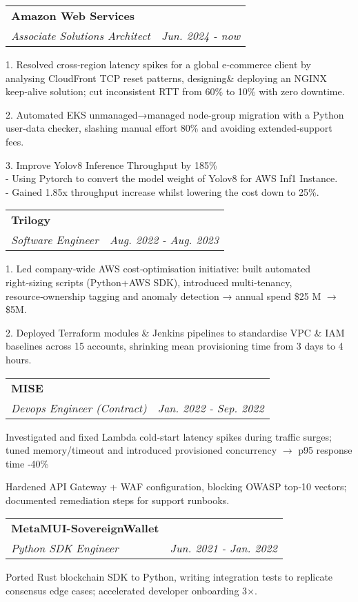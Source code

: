 \documentclass[letterpaper,11pt]{article}
\makeatletter
\renewenvironment{itemize}{
  \begin{list}{}{
    \setlength{\leftmargin}{0.6em}
    \setlength{\textwidth}{7.5in}
    \setlength{\topmargin}{-0.6in}
    \setlength{\textheight}{19.5in}
  }
}{
  \end{list}
}
\newcommand{\resitem}[1]{\item #1 \vspace{-2pt}}
\newcommand{\resheading}[1]{{\large \parashade[.9]{sharpcorners}{\textbf{#1 \vphantom{p\^{E}}}}}}
\newcommand{\ressubheading}[4]{
\begin{tabular*}{6.5in}{l@{\extracolsep{\fill}}r}
		\textbf{#1} & #2 \\
		\textit{#3} & \textit{#4} \\
\end{tabular*}\vspace{-8.5pt}} %
\makeatother
\begin{document}
\resheading{Work Experiences}
\begin{itemize}
\item
	\ressubheading{Amazon Web Services}{}{Associate Solutions Architect}{Jun. 2024 - now}
	\begin{itemize}
		\resitem{
1. Resolved cross‑region latency spikes for a global e‑commerce client by analysing CloudFront TCP reset patterns, designing\& deploying an NGINX keep‑alive solution; cut inconsistent RTT from 60\% to 10\% with zero downtime.
                }
		\resitem{
2. Automated EKS unmanaged→managed node‑group migration with a Python user‑data checker, slashing manual effort 80\% and avoiding extended‑support fees.
		}
		\resitem{
3. Improve Yolov8 Inference Throughput by 185\% \\
- Using Pytorch to convert the model weight of Yolov8 for AWS Inf1 Instance. \\
- Gained 1.85x throughput increase whilst lowering the cost down to 25\%.  
                }
	\end{itemize}

	\ressubheading{Trilogy}{}{Software Engineer}{Aug. 2022 - Aug. 2023}
	\begin{itemize}
		\resitem{
1. Led company‑wide AWS cost‑optimisation initiative: built automated right‑sizing scripts (Python+AWS SDK), introduced multi-tenancy, resource‑ownership tagging and anomaly detection → annual spend \$25 M $\rightarrow$ \$5M.
		}
		\resitem{
2. Deployed Terraform modules \& Jenkins pipelines to standardise VPC \& IAM baselines across 15 accounts, shrinking mean provisioning time from 3 days to 4 hours.\\
		}
	\end{itemize}
	\ressubheading{MISE}{}{Devops Engineer (Contract)}{Jan. 2022 - Sep. 2022}
	\begin{itemize}
		\resitem{
Investigated and fixed Lambda cold‑start latency spikes during traffic surges; tuned memory/timeout and introduced provisioned concurrency $\rightarrow$ p95 response time ‑40\%\\
			}
		\resitem{
Hardened API Gateway + WAF configuration, blocking OWASP top‑10 vectors; documented remediation steps for support runbooks.\\
			}
	\end{itemize}
	\ressubheading{MetaMUI-SovereignWallet}{}{Python SDK Engineer}{Jun. 2021 - Jan. 2022}
	\begin{itemize}
		\resitem{
Ported Rust blockchain SDK to Python, writing integration tests to replicate consensus edge cases; accelerated developer onboarding 3×.\\
			}
	\end{itemize}
\end{itemize}
\end{document}
